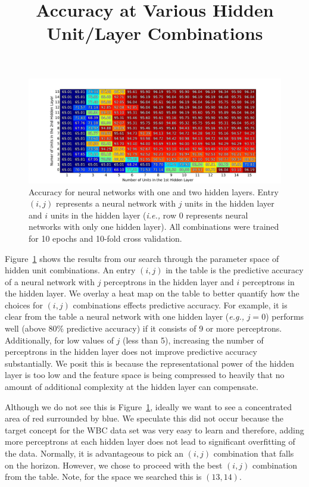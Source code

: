 \begin{figure}[t]
  \title{Accuracy at Various Hidden Unit/Layer Combinations}
\centering

\includegraphics[width=\textwidth]{figs/wbcd_table}

\caption {Accuracy for neural networks with one and two hidden layers. Entry \((i,j)\) represents a neural network with \(j\) units in the  hidden layer and \(i\) units in the  hidden layer ({\em i.e.,} row 0 represents neural networks with only one hidden layer). All combinations were trained for 10 epochs and 10-fold cross validation.}
\label{fig:wbcd_table}
\end{figure}

Figure~\ref{fig:wbcd_table} shows the results from our search through the parameter space of hidden unit combinations.
An entry \((i,j)\) in the table is the predictive accuracy of a neural network with \(j\) perceptrons in the  hidden layer and \(i\) perceptrons in the  hidden layer.
We overlay a heat map on the table to better quantify how the choices for \((i,j)\) combinations effects predictive accuracy.
For example, it is clear from the table a neural network with one hidden layer ({\em e.g.,} \(j=0\)) performs well (above 80\% predictive accuracy) if it consists of 9 or more perceptrons.
Additionally, for low values of \(j\) (less than 5), increasing the number of perceptrons in the  hidden layer does not improve predictive accuracy substantially.
We posit this is because the representational power of the  hidden layer is too low and the feature space is being compressed to heavily that no amount of additional complexity at the  hidden layer can compensate.

Although we do not see this is Figure~\ref{fig:wbcd_table}, ideally we want to see a concentrated area of red surrounded by blue.
We speculate this did not occur because the target concept for the WBC data set was very easy to learn and therefore, adding more perceptrons at each hidden layer does not lead to significant overfitting of the data.
Normally, it is advantageous to pick an \((i,j)\) combination that falls on the horizon.
However, we chose to proceed with the best \((i,j)\) combination from the table.
Note, for the space we searched this is \((13,14)\).

